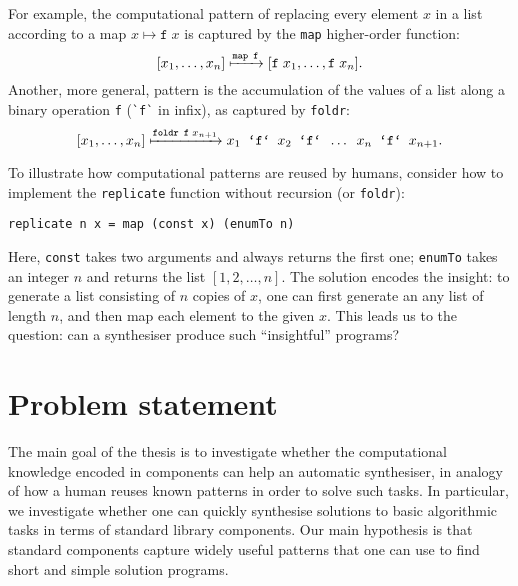 For example, the computational pattern of replacing every element $x$ in a list according to a map $x \mapsto \texttt{f} \; x$ is captured by the \lstinline!map! higher-order function:
\[ [x_1, \dots, x_n] \xmapsto{\texttt{map f}} [\texttt{f} \; x_1, \dots, \texttt{f} \; x_n]. \]
Another, more general, pattern is the accumulation of the values of a list along a binary operation \lstinline!f! (\lstinline!`f`! in infix), as captured by \lstinline!foldr!:
\[ [x_1, \dots, x_n] \xmapsto{\texttt{foldr f} \; x_{n+1}} x_1 \texttt{ `f` } x_2 \texttt{ `f` } \dots \texttt{ } x_n \texttt{ `f` } x_{n+1}. \] 


To illustrate how computational patterns are reused by humans, consider how to implement the \lstinline!replicate! function without recursion (or \lstinline!foldr!):
\begin{lstlisting}[style=plain]
replicate n x = map (const x) (enumTo n)
\end{lstlisting}
Here, \lstinline!const! takes two arguments and always returns the first one; \lstinline!enumTo! takes an integer $n$ and returns the list $[1, 2, \ldots, n]$.  The solution encodes the insight: to generate a list consisting of $n$ copies of $x$, one can first generate an any list of length $n$, and then map each element to the given $x$.  This leads us to the question: can a synthesiser produce such ``insightful'' programs?

\section{Problem statement}

The main goal of the thesis is to investigate whether the computational knowledge encoded in components can help an automatic synthesiser, in analogy of how a human reuses known patterns in order to solve such tasks.  In particular, we investigate whether one can quickly synthesise solutions to basic algorithmic tasks in terms of standard library components.  Our main hypothesis is that standard components capture widely useful patterns that one can use to find short and simple solution programs.

